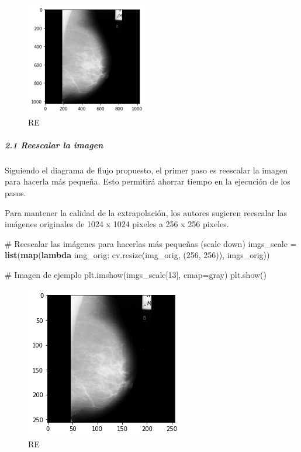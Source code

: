 \documentclass[
]{article}
\newenvironment{Shaded}{\begin{snugshade}}{\end{snugshade}}
\newcommand{\BuiltInTok}[1]{\textcolor[rgb]{0.39,0.29,0.61}{\textbf{#1}}}
\newcommand{\CommentTok}[1]{\textcolor[rgb]{0.54,0.53,0.53}{#1}}
\newcommand{\DecValTok}[1]{\textcolor[rgb]{0.69,0.50,0.00}{#1}}
\newcommand{\KeywordTok}[1]{\textcolor[rgb]{0.12,0.11,0.11}{\textbf{#1}}}
\newcommand{\NormalTok}[1]{\textcolor[rgb]{0.12,0.11,0.11}{#1}}
\newcommand{\OperatorTok}[1]{\textcolor[rgb]{0.12,0.11,0.11}{#1}}
\newcommand{\StringTok}[1]{\textcolor[rgb]{0.75,0.01,0.01}{#1}}
\begin{document}
\begin{figure}
\centering
\includegraphics{img/tarea_2_0.png}
\caption{RE}
\end{figure}

\hypertarget{reescalar-la-imagen}{%
\subparagraph{2.1 Reescalar la imagen}\label{reescalar-la-imagen}}

Siguiendo el diagrama de flujo propuesto, el primer paso es reescalar la
imagen para hacerla más pequeña. Esto permitirá ahorrar tiempo en la
ejecución de los pasos.

Para mantener la calidad de la extrapolación, los autores sugieren
reescalar las imágenes originales de 1024 x 1024 pixeles a 256 x 256
pixeles.

\begin{Shaded}
\begin{Highlighting}[]
\CommentTok{\# Reescalar las imágenes para hacerlas más pequeñas (scale down)}
\NormalTok{imgs\_scale }\OperatorTok{=} \BuiltInTok{list}\NormalTok{(}\BuiltInTok{map}\NormalTok{(}\KeywordTok{lambda}\NormalTok{ img\_orig: cv.resize(img\_orig, (}\DecValTok{256}\NormalTok{, }\DecValTok{256}\NormalTok{)), imgs\_orig))}

\CommentTok{\# Imagen de ejemplo}
\NormalTok{plt.imshow(imgs\_scale[}\DecValTok{13}\NormalTok{], cmap}\OperatorTok{=}\StringTok{\textquotesingle{}gray\textquotesingle{}}\NormalTok{)}
\NormalTok{plt.show()}
\end{Highlighting}
\end{Shaded}

\begin{figure}
\centering
\includegraphics{img/tarea_2_1.png}
\caption{RE}
\end{figure}
\end{document}
